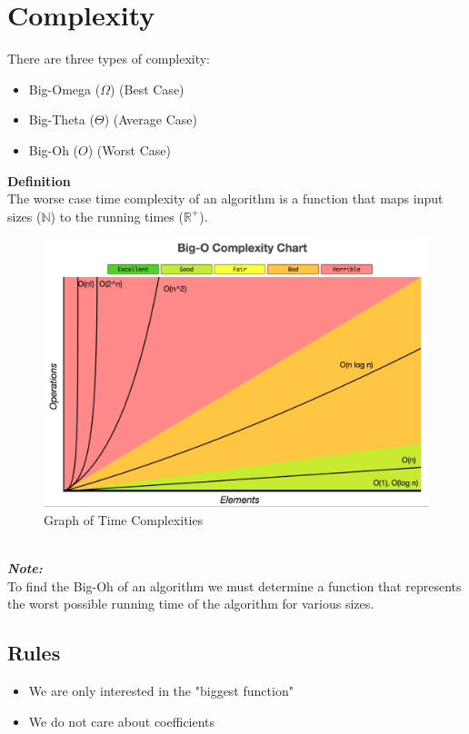 \documentclass[11pt]{article}
\begin{document}
\section{Complexity}
There are three types of complexity:
\begin{itemize}
    \item Big-Omega ($\Omega$) (Best Case)
    \item Big-Theta ($\Theta$) (Average Case)
    \item Big-Oh ($O$) (Worst Case)
\end{itemize}
\textbf{Definition}\\
The worse case time complexity of an algorithm is a function that maps input sizes ($\mathbb N$) to the running times ($\mathbb R^+$).
\begin{figure}[h!]
    \centering
    \includegraphics[scale=0.25]{complexity.png}
    \caption{Graph of Time Complexities}
\end{figure}\\[0.5\baselineskip]
\textbf{\textit{Note:}}\\
To find the Big-Oh of an algorithm we must determine a function that represents the worst possible running time of the algorithm for various sizes.
\subsection{Rules}
\begin{itemize}
    \item We are only interested in the "biggest function"
    \item We do not care about coefficients
\end{itemize}
\end{document}
